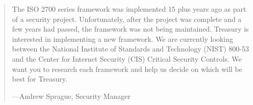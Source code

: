 \begin{formal}

          \begin{quote}
          
                    The ISO 2700 series framework was implemented 15 plus years ago as part of a security project.
                    Unfortunately, after the project was complete and a few years had passed, the framework was
                    not being maintained. Treasury is interested in implementing a new framework. We are 
                    currently looking between the National Institute of Standards and Technology (NIST) 800-53 
                    and the Center for Internet Security (CIS) Critical Security Controls. We want you to research each
                    framework and help us decide on which will be best for Treasury.
                    
                         \begin{flushright}
                                   ---Andrew Sprague, Security Manager
                         \end{flushright}
          
          \end{quote}
          
\end{formal}